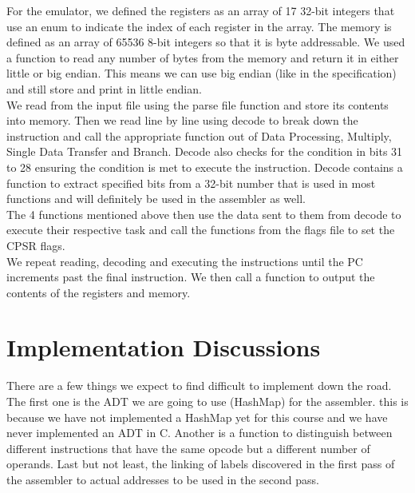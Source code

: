 \documentclass{article}
\begin{document}
For the emulator, we defined the registers as an array of 17 32-bit integers that use an enum to indicate the index of each register in the array. The memory is defined as an array of 65536 8-bit integers so that it is byte addressable. We used a function to read any number of bytes from the memory and return it in either little or big endian. This means we can use big endian (like in the specification) and still store and print in little endian.  \\

\noindent We read from the input file using the parse file function and store its contents into memory. Then we read line by line using decode to break down the instruction and call the appropriate function out of Data Processing, Multiply, Single Data Transfer and Branch. Decode also checks for the condition in bits 31 to 28 ensuring the condition is met to execute the instruction. Decode contains a function to extract specified bits from a 32-bit number that is used in most functions and will definitely be used in the assembler as well. \\


\noindent The 4 functions mentioned above then use the data sent to them from decode to execute their respective task and call the functions from the flags file to set the CPSR flags. \\


\noindent We repeat reading, decoding and executing the instructions until the PC increments past the final instruction. We then call a function to output the contents of the registers and memory. 

\section*{Implementation Discussions}

There are a few things we expect to find difficult to implement down the road. The first one is the ADT we are going to use (HashMap) for the assembler. this is because we have not implemented a HashMap yet for this course and we have never implemented an ADT in C. Another is a function to distinguish between different instructions that have the same opcode but a different number of operands. Last but not least, the linking of labels discovered in the first pass of the assembler to actual addresses to be used in the second pass. 
\end{document}
